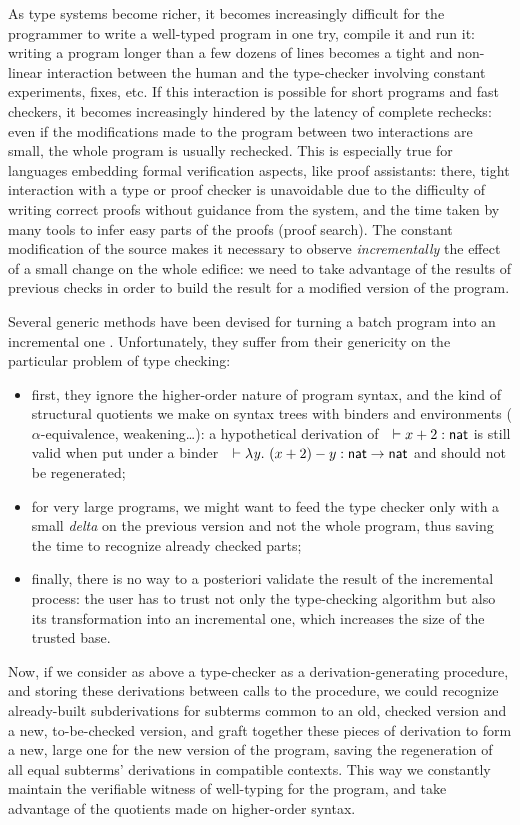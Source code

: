 \documentclass{llncs}
\begin{document}
As type systems become richer, it becomes increasingly difficult for
the programmer to write a well-typed program in one try, compile it
and run it: writing a program longer than a few dozens of lines
becomes a tight and non-linear interaction between the human and the
type-checker involving constant experiments, fixes, etc. If this
interaction is possible for short programs and fast checkers, it
becomes increasingly hindered by the latency of complete rechecks:
even if the modifications made to the program between two interactions
are small, the whole program is usually rechecked. This is especially
true for languages embedding formal verification aspects, like proof
assistants: there, tight interaction with a type or proof checker is
unavoidable due to the difficulty of writing correct proofs without
guidance from the system, and the time taken by many tools to infer
easy parts of the proofs (proof search). The constant modification of
the source makes it necessary to observe \emph{incrementally} the
effect of a small change on the whole edifice: we need to take
advantage of the results of previous checks in order to build the
result for a modified version of the program.

Several generic methods have been devised for turning a batch program
into an incremental one \cite{acar2006,carlsson2002}. Unfortunately,
they suffer from their genericity on the particular problem of type
checking:
\begin{itemize}
\item first, they ignore the higher-order nature of program syntax,
  and the kind of structural quotients we make on syntax trees with
  binders and environments ($\alpha$-equivalence, weakening\ldots): a
  hypothetical derivation of\ \ $\vdash x+2 : \text{\textsf{nat}}$ is still valid
  when put under a binder\ \ $\vdash\lambda{\ensuremath{\text{\textit{y}}}}.\  (x + 2) -
  y:\text{\textsf{nat}}\to\text{\textsf{nat}}$ and should not be regenerated;
\item for very large programs, we might want to feed the type checker
  only with a small \emph{delta} on the previous version and not the
  whole program, thus saving the time to recognize already checked
  parts;
\item finally, there is no way to a posteriori validate the result of
  the incremental process: the user has to trust not only the
  type-checking algorithm but also its transformation into an
  incremental one, which increases the size of the trusted base.
\end{itemize}

Now, if we consider as above a type-checker as a derivation-generating
procedure, and storing these derivations between calls to the
procedure, we could recognize already-built subderivations for
subterms common to an old, checked version and a new, to-be-checked
version, and graft together these pieces of derivation to form a new,
large one for the new version of the program, saving the regeneration
of all equal subterms' derivations in compatible contexts. This way we
constantly maintain the verifiable witness of well-typing for the
program, and take advantage of the quotients made on higher-order
syntax.
\end{document}
